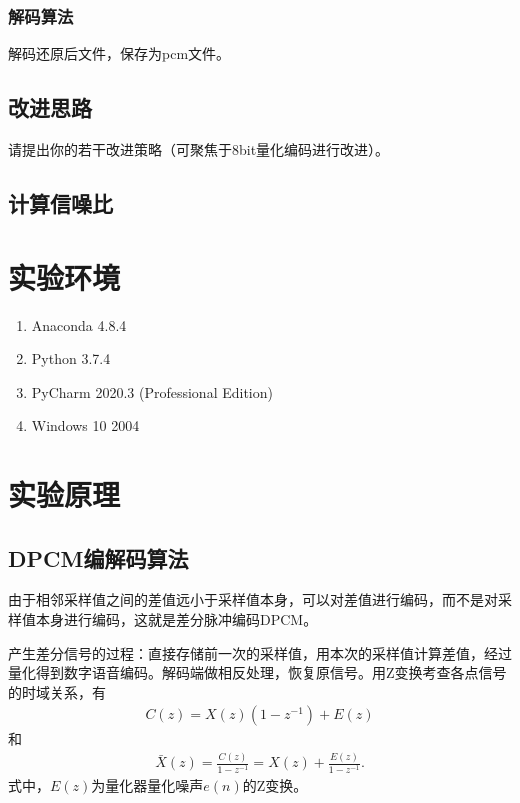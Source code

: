 \documentclass{hitreport}
\begin{document}
\subsubsection{解码算法}

解码还原后文件，保存为pcm文件。

\subsection{改进思路}

请提出你的若干改进策略（可聚焦于8bit量化编码进行改进）。

\subsection{计算信噪比}



\section{实验环境}

\begin{enumerate}
\item Anaconda 4.8.4
\item Python 3.7.4
\item PyCharm 2020.3 (Professional Edition)
\item Windows 10 2004
\end{enumerate}

\section{实验原理}

\subsection{DPCM编解码算法}\label{sec:energy}

由于相邻采样值之间的差值远小于采样值本身，可以对差值进行编码，而不是对采样值本身进行编码，这就是差分脉冲编码DPCM。

产生差分信号的过程：直接存储前一次的采样值，用本次的采样值计算差值，经过量化得到数字语音编码。解码端做相反处理，恢复原信号。用Z变换考查各点信号的时域关系，有
\begin{align}
C\left(z\right) = X\left(z\right)\left(1-z^{-1}\right) +E\left(z\right)
\end{align}
和
\begin{align}
\bar{X}\left(z\right) = \frac{C\left(z\right)}{1-z^{-1}} = X\left(z\right) + \frac{E\left(z\right)}{1-z^{-1}}.
\end{align}
式中，$E\left(z\right)$为量化器量化噪声$e\left(n\right)$的Z变换。
\end{document}
